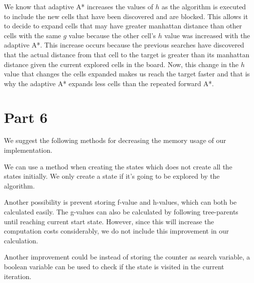 \documentclass{article}
\begin{document}
We know that adaptive A* increases the values of $h$ as the algorithm is executed to include the new cells that have been discovered and are blocked. This allows it to decide to expand cells that may have greater manhattan distance than other cells with the same $g$ value because the other cell's $h$ value was increased with the adaptive A*. This increase occurs because the previous searches have discovered that the actual distance from that cell to the target is greater than its manhattan distance given the current explored cells in the board. Now, this change in the $h$ value that changes the cells expanded makes us reach the target faster and that is why the adaptive A* expands less cells than the repeated forward A*.

\section*{Part 6}
We suggest the following methods for decreasing the memory usage of our implementation. 

We can use a method when creating the states which does not  create all the states initially. We only create a state if it's going to be explored by the algorithm.

Another possibility is prevent storing f-value and h-values, which can both be calculated easily. The g-values can also be calculated by following tree-parents until reaching current start state. However, since this will increase the computation costs considerably, we do not include this improvement in our calculation. 

 Another improvement could be instead of storing the counter as search variable, a boolean variable can be used to check if the state is visited in the current iteration.
\end{document}
